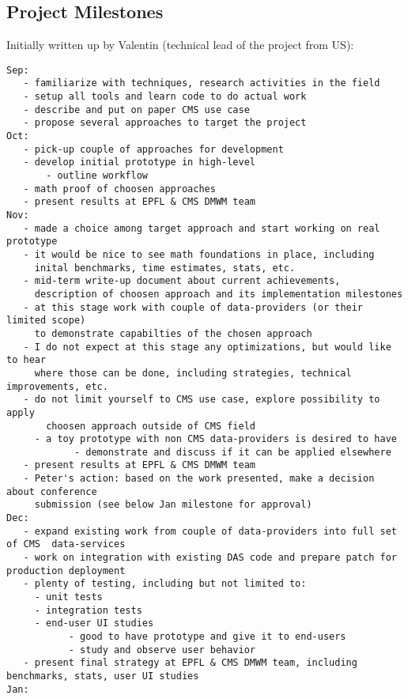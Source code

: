 \begin{appendix}
\section{Project Milestones}

Initially written up by Valentin (technical lead of the project from US):

\begin{footnotesize}
\begin{Verbatim}[commandchars=\\\{\}]
Sep:
   - familiarize with techniques, research activities in the field
   - setup all tools and learn code to do actual work
   - describe and put on paper CMS use case
   - propose several approaches to target the project
Oct:
   - pick-up couple of approaches for development
   - develop initial prototype in high-level
       - outline workflow
   - math proof of choosen approaches
   - present results at EPFL & CMS DMWM team
Nov:
   - made a choice among target approach and start working on real prototype
   - it would be nice to see math foundations in place, including 
     inital benchmarks, time estimates, stats, etc.
   - mid-term write-up document about current achievements, 
     description of choosen approach and its implementation milestones
   - at this stage work with couple of data-providers (or their limited scope) 
     to demonstrate capabilties of the chosen approach
   - I do not expect at this stage any optimizations, but would like to hear 
     where those can be done, including strategies, technical improvements, etc.
   - do not limit yourself to CMS use case, explore possibility to apply
       choosen approach outside of CMS field
     - a toy prototype with non CMS data-providers is desired to have
            - demonstrate and discuss if it can be applied elsewhere
   - present results at EPFL & CMS DMWM team
   - Peter's action: based on the work presented, make a decision about conference
     submission (see below Jan milestone for approval)
Dec:
   - expand existing work from couple of data-providers into full set of CMS  data-services
   - work on integration with existing DAS code and prepare patch for  production deployment
   - plenty of testing, including but not limited to:
     - unit tests
     - integration tests
     - end-user UI studies
           - good to have prototype and give it to end-users
           - study and observe user behavior
   - present final strategy at EPFL & CMS DMWM team, including benchmarks, stats, user UI studies
Jan:

\end{Verbatim}
\end{footnotesize}
\end{appendix}
